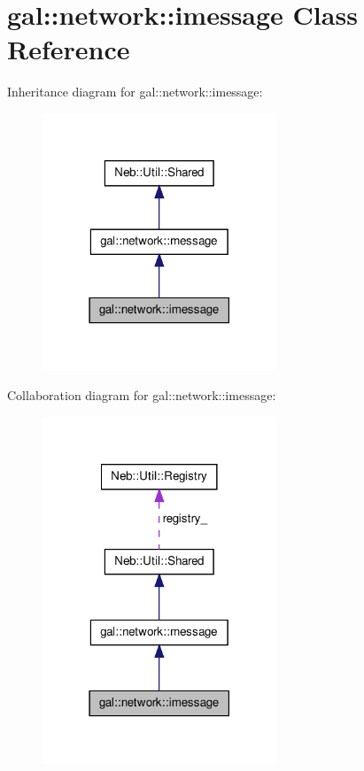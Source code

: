 \hypertarget{classgal_1_1network_1_1imessage}{\section{gal\-:\-:network\-:\-:imessage \-Class \-Reference}
\label{classgal_1_1network_1_1imessage}
}


\-Inheritance diagram for gal\-:\-:network\-:\-:imessage\-:\nopagebreak
\begin{figure}[H]
\begin{center}
\leavevmode
\includegraphics[width=198pt]{classgal_1_1network_1_1imessage__inherit__graph}
\end{center}
\end{figure}


\-Collaboration diagram for gal\-:\-:network\-:\-:imessage\-:\nopagebreak
\begin{figure}[H]
\begin{center}
\leavevmode
\includegraphics[width=198pt]{classgal_1_1network_1_1imessage__coll__graph}
\end{center}
\end{figure}
